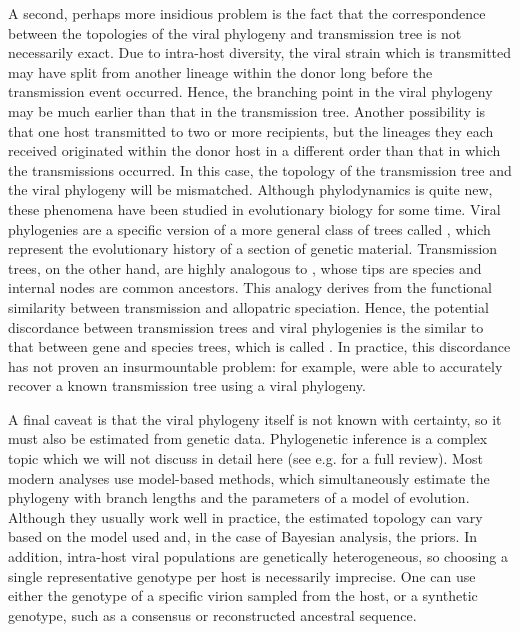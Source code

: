 A second, perhaps more insidious problem is the fact that the correspondence
between the topologies of the viral phylogeny and transmission tree is not
necessarily exact. Due to intra-host diversity, the viral strain which is
transmitted may have split from another lineage within the donor long before
the transmission event occurred. Hence, the branching point in the viral
phylogeny may be much earlier than that in the transmission tree. Another
possibility is that one host transmitted to two or more recipients, but the
lineages they each received originated within the donor host in a different
order than that in which the transmissions occurred. In this case, the topology
of the transmission tree and the viral phylogeny will be mismatched. Although
phylodynamics is quite new, these phenomena have been studied in evolutionary
biology for some time. Viral phylogenies are a specific version of a more
general class of trees called , which represent the
evolutionary history of a section of genetic material. Transmission trees, on
the other hand, are highly analogous to , whose tips are
species and internal nodes are common ancestors. This analogy derives from the
functional similarity between transmission and allopatric speciation. Hence,
the potential discordance between transmission trees and viral phylogenies is
the similar to that between gene and species trees, which is called
. In practice, this discordance has not proven
an insurmountable problem: for example, \textcite{leitner1996accurate} were
able to accurately recover a known transmission tree using a viral phylogeny.

A final caveat is that the viral phylogeny itself is not known with certainty,
so it must also be estimated from genetic data. Phylogenetic inference is a
complex topic which we will not discuss in detail here (see e.g.
\autocite{nei2000molecular} for a full review). Most modern analyses use
model-based methods, which simultaneously estimate the phylogeny with branch
lengths and the parameters of a model of evolution. Although they usually work
well in practice, the estimated topology can vary based on the model used and,
in the case of Bayesian analysis, the priors.  In addition, intra-host viral
populations are genetically heterogeneous, so choosing a single representative
genotype per host is necessarily imprecise. One can use either the genotype of
a specific virion sampled from the host, or a synthetic genotype, such as a
consensus or reconstructed ancestral sequence.

